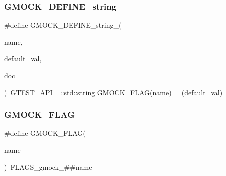 \mbox{\label{googletest-master_2googlemock_2include_2gmock_2internal_2gmock-port_8h_ad6badbf90e5a813e2bd5668fc6b6a8f7}} 
\subsubsection{\texorpdfstring{GMOCK\_DEFINE\_string\_}{GMOCK\_DEFINE\_string\_}}
{\footnotesize\ttfamily \#define G\+M\+O\+C\+K\+\_\+\+D\+E\+F\+I\+N\+E\+\_\+string\+\_\+(\begin{DoxyParamCaption}\item[{}]{name,  }\item[{}]{default\+\_\+val,  }\item[{}]{doc }\end{DoxyParamCaption})~\mbox{\hyperlink{_obj__test_2lib_2googletest-release-1_88_81_2googletest_2include_2gtest_2internal_2gtest-port_8h_aa73be6f0ba4a7456180a94904ce17790}{G\+T\+E\+S\+T\+\_\+\+A\+P\+I\+\_\+}} \+::std\+::string \mbox{\hyperlink{_obj__test_2lib_2googletest-release-1_88_81_2googlemock_2include_2gmock_2internal_2gmock-port_8h_ad7119adfef06be5e7b1551633f5a1436}{G\+M\+O\+C\+K\+\_\+\+F\+L\+AG}}(name) = (default\+\_\+val)}

\mbox{\label{googletest-master_2googlemock_2include_2gmock_2internal_2gmock-port_8h_ad7119adfef06be5e7b1551633f5a1436}} 
\subsubsection{\texorpdfstring{GMOCK\_FLAG}{GMOCK\_FLAG}}
{\footnotesize\ttfamily \#define G\+M\+O\+C\+K\+\_\+\+F\+L\+AG(\begin{DoxyParamCaption}\item[{}]{name }\end{DoxyParamCaption})~F\+L\+A\+G\+S\+\_\+gmock\+\_\+\#\#name}

